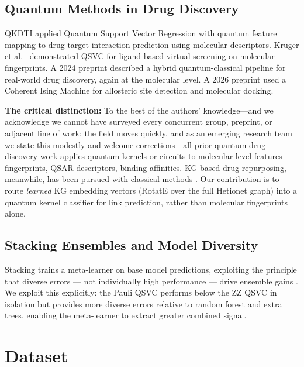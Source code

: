 \documentclass[10pt,twocolumn]{article}
\begin{document}
\subsection{Quantum Methods in Drug Discovery}
\label{sec:critical_distinction}

QKDTI \cite{qkdti2025} applied Quantum Support Vector Regression with quantum feature mapping to drug-target interaction prediction using molecular descriptors. Kruger et al.\ \cite{kruger2023} demonstrated QSVC for ligand-based virtual screening on molecular fingerprints. A 2024 preprint \cite{hybrid2024} described a hybrid quantum-classical pipeline for real-world drug discovery, again at the molecular level. A 2026 preprint \cite{quantum2026} used a Coherent Ising Machine for allosteric site detection and molecular docking.

\textbf{The critical distinction:} To the best of the authors' knowledge---and
we acknowledge we cannot have surveyed every concurrent group, preprint, or
adjacent line of work; the field moves quickly, and as an emerging research
team we state this modestly and welcome corrections---all prior quantum drug
discovery work applies quantum kernels or circuits to molecular-level
features---fingerprints, QSAR descriptors, binding affinities.
KG-based drug repurposing, meanwhile, has been pursued with classical methods
\cite{mayers2023,llmrag2025,quantum2026}.
Our contribution is to route \emph{learned} KG embedding vectors (RotatE over the
full Hetionet graph) into a quantum kernel classifier for link prediction, rather
than molecular fingerprints alone.

\subsection{Stacking Ensembles and Model Diversity}

Stacking trains a meta-learner on base model predictions, exploiting the principle that diverse errors --- not individually high performance --- drive ensemble gains \cite{wolpert1992}. We exploit this explicitly: the Pauli QSVC performs below the ZZ QSVC in isolation but provides more diverse errors relative to random forest and extra trees, enabling the meta-learner to extract greater combined signal.

\section{Dataset}
\end{document}

